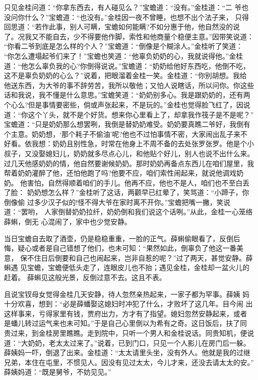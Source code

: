 只见金桂问道：“你拿东西去，有人碰见么？”宝蟾道：“没有。”金桂道：“二
爷也没问你什么？”宝蟾道：“也没有。”金桂因一夜不曾睡，也想不出个法子来，
只得回思道：“若作此事，别人可瞒，宝蟾如何能瞒?不如分惠于他，他自然没的说
了。况我又不能自去，少不得要他作脚，索性和他商量个稳便主意。”因带笑说道：
“你看二爷到底是怎么样的个人？”宝蟾道：“倒像是个糊涂人。”金桂听了笑道：
“你怎么遭塌起爷们来了！”宝蟾也笑道：“他辜负奶奶的心，我就说得他。”金桂
道：“他怎么辜负我的心?你倒得说说。”宝蟾道：“奶奶给他好东西吃，他倒不吃，
这不是辜负奶奶的心么？”说着，把眼溜着金桂一笑。金桂道：“你别胡想。我给
他送东西，为大爷的事不辞劳苦，我所以敬他；又怕人说瞎话，所以问你。你这些
话和我说，我不懂是什么意思。”宝蟾笑道：“奶奶别多心。我是跟奶奶的，还有两
个心么?但是事情要密些，倘或声张起来，不是玩的。”金桂也觉得脸飞红了，因说
道：“你这个丫头，就不是个好货。想来你心里看上了，却拿我作筏子是不是呢？”
宝蟾道：“只是奶奶那么想罢咧，我倒是替奶奶难受。奶奶要真瞧二爷好，我倒有
个主意。奶奶想，‘那个耗子不偷油’呢?他也不过怕事情不密，大家闹出乱子来不
好看。依我想：奶奶且别性急，时常在他身上不周不备的去处张罗张罗。他是个小
叔子，又没娶媳妇儿，奶奶就多尽点心儿，和他贴个好儿，别人也说不出什么来。
过几天他感奶奶的情，他自然要谢候奶奶。那时奶奶再备点东西儿在咱们屋里，我
帮着奶奶灌醉了他，还怕他跑了吗?他要不应，咱们索性闹起来，就说他调戏奶奶。
他害怕，自然得顺着咱们的手儿。他再不应，他也不是人，咱们也不至白丢了脸：
奶奶想怎么样？”金桂听了这话，两颧早已红晕了，笑骂道：“小蹄子，你倒像偷
过多少汉子似的!怪不得大爷在家时离不开你。”宝蟾把嘴一撇，笑说道：“罢哟，
人家倒替奶奶拉纤，奶奶倒和我们说这个话咧。”从此，金桂一心笼络薛蝌，倒无
心混闹了，家中也少觉安静。

当日宝蟾自去取了酒壶，仍是稳稳重重，一脸的正气。薛蝌偷眼看了，反倒后
悔，疑心或者是自己错想了他们，也未可知：“果然如此，倒辜负了他这一番美意，
保不住日后倒要和自己也闹起来，岂非自惹的呢？”过了两天，甚觉安静。薛蝌遇
见宝蟾，宝蟾便低头走了，连眼皮儿也不抬；遇见金桂，金桂却一盆火儿的赶着。
薛蝌见这般光景，反倒过意不去。这且不表。

且说宝钗母女觉得金桂几天安静，待人忽然亲热起来，一家子都为罕事。薛姨
妈十分欢喜，想到：“必是薛蟠娶这媳妇时冲犯了什么，才败坏了这几年。目今闹
出这样事来，亏得家里有钱，贾府出力，方才有了指望。媳妇忽然安静起来，或者
是蟠儿转过运气来也未可知。”于是自己心里倒以为希有之奇。这日饭后，扶了同
贵过来，到金桂房里瞧瞧。走到院中，只听一个男人和金桂说话。同贵知机，便说
道：“大奶奶，老太太过来了。”说着，已到门口，只见一个人影儿在房门后一躲。
薛姨妈一吓，倒退了出来。金桂道：“太太请里头坐，没有外人。他就是我的过继
兄弟，本住在屯里，不惯见人。因没有见过太太，今儿才来，还没去请太太的安。”
薛姨妈道：“既是舅爷，不妨见见。”

